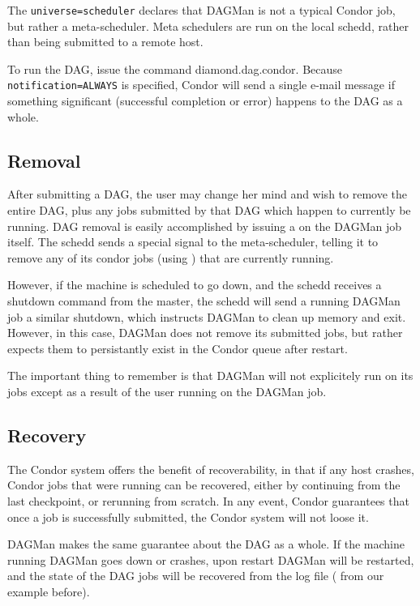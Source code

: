 The \texttt{universe=scheduler} declares that DAGMan is not a typical Condor
job, but rather a meta-scheduler.  Meta schedulers are run on the local
schedd, rather than being submitted to a remote host.

To run the DAG, issue the command  diamond.dag.condor.  Because
\texttt{notification=ALWAYS} is specified, Condor will send a single e-mail
message if something significant (successful completion or error) happens to
the DAG as a whole.

\subsection{Removal}

After submitting a DAG, the user may change her mind and wish to remove the
entire DAG, plus any jobs submitted by that DAG which happen to currently be
running.  DAG removal is easily accomplished by issuing a  on the
DAGMan job itself.  The schedd sends a special signal to the meta-scheduler,
telling it to remove any of its condor jobs (using ) that are
currently running.

However, if the machine is scheduled to go down, and the schedd receives a
shutdown command from the master, the schedd will send a running DAGMan job a
similar shutdown, which instructs DAGMan to clean up memory and exit.
However, in this case, DAGMan does not remove its submitted jobs, but rather
expects them to persistantly exist in the Condor queue after restart.

The important thing to remember is that DAGMan will not explicitely run
 on its jobs except as a result of the user running  on
the DAGMan job.

\subsection{Recovery}

The Condor system offers the benefit of recoverability, in that if any host
crashes, Condor jobs that were running can be recovered, either by continuing
from the last checkpoint, or rerunning from scratch.  In any event, Condor
guarantees that once a job is successfully submitted, the Condor system will
not loose it.

DAGMan makes the same guarantee about the DAG as a whole.  If the machine
running DAGMan goes down or crashes, upon restart DAGMan will be restarted,
and the state of the DAG jobs will be recovered from the log file
( from our example before).

